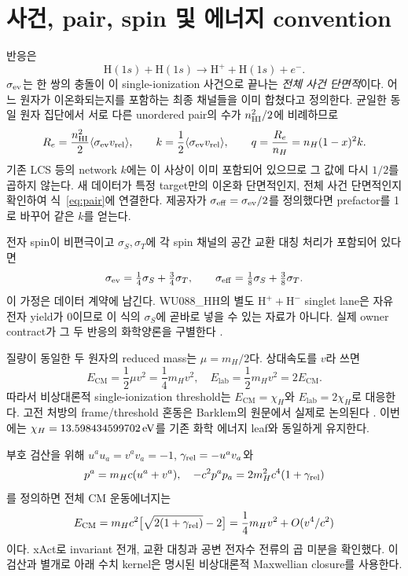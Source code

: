 \documentclass[11pt,a4paper]{article}
\newcommand{\sig}{\sigma_{\rm ev}}\newcommand{\cm}{\mathrm{CM}}\newcommand{\lab}{\mathrm{lab}}\newcommand{\hh}{\mathrm{HH}}
\begin{document}
\newpage
\section{사건, pair, spin 및 에너지 convention}
반응은
\begin{equation}
\mathrm H(1s)+\mathrm H(1s)\longrightarrow\mathrm H^++\mathrm H(1s)+e^-.
\end{equation}
$\sig$는 한 쌍의 충돌이 이 single-ionization 사건으로 끝나는 \emph{전체 사건 단면적}이다. 어느 원자가 이온화되는지를 포함하는 최종 채널들을 이미 합쳤다고 정의한다. 균일한 동일 원자 집단에서 서로 다른 unordered pair의 수가 $n_{\rm HI}^2/2$에 비례하므로
\begin{equation}\label{eq:pair}
R_e=\frac{n_{\rm HI}^2}{2}\langle\sig v_{\rm rel}\rangle,
\qquad k=\frac12\langle\sig v_{\rm rel}\rangle,
\qquad q=\frac{R_e}{n_H}=n_H(1-x)^2k.
\end{equation}
기존 LCS 등의 network $k$에는 이 사상이 이미 포함되어 있으므로 그 값에 다시 $1/2$를 곱하지 않는다. 새 데이터가 특정 target만의 이온화 단면적인지, 전체 사건 단면적인지 확인하여 식~\eqref{eq:pair}에 연결한다. 제공자가 $\sigma_{\rm eff}=\sig/2$를 정의했다면 prefactor를 1로 바꾸어 같은 $k$를 얻는다.

전자 spin이 비편극이고 $\sigma_S,\sigma_T$에 각 spin 채널의 공간 교환 대칭 처리가 포함되어 있다면
\begin{equation}
\sig=\tfrac14\sigma_S+\tfrac34\sigma_T,
\qquad \sigma_{\rm eff}=\tfrac18\sigma_S+\tfrac38\sigma_T.
\end{equation}
이 가정은 데이터 계약에 남긴다. WU088\_HH의 별도 $\mathrm H^++\mathrm H^-$ singlet lane은 자유전자 yield가 0이므로 이 식의 $\sigma_S$에 곧바로 넣을 수 있는 자료가 아니다. 실제 owner contract가 그 두 반응의 화학양론을 구별한다 \cite{hhowner}.

질량이 동일한 두 원자의 reduced mass는 $\mu=m_H/2$다. 상대속도를 $v$라 쓰면
\begin{equation}
E_{\cm}=\frac12\mu v^2=\frac14m_Hv^2,
\quad E_{\lab}=\frac12m_Hv^2=2E_{\cm}.
\end{equation}
따라서 비상대론적 single-ionization threshold는 $E_{\cm}=\chi_H$와 $E_{\lab}=2\chi_H$로 대응한다. 고전 처방의 frame/threshold 혼동은 Barklem의 원문에서 실제로 논의된다 \cite{barklem}. 이번에는 $\chi_H=13.598434599702\,\mathrm{eV}$를 기존 화학 에너지 leaf와 동일하게 유지한다.

부호 검산을 위해 $u^au_a=v^av_a=-1$, $\gamma_{\rm rel}=-u^av_a$와
\begin{equation}
p^a=m_Hc(u^a+v^a),\quad
-c^2p^ap_a=2m_H^2c^4(1+\gamma_{\rm rel})
\end{equation}
를 정의하면 전체 CM 운동에너지는
\begin{equation}
E_{\cm}=m_Hc^2\bigl[\sqrt{2(1+\gamma_{\rm rel})}-2\bigr]
=\frac14m_Hv^2+O(v^4/c^2)
\end{equation}
이다. xAct로 invariant 전개, 교환 대칭과 공변 전자수 전류의 곱 미분을 확인했다. 이 검산과 별개로 아래 수치 kernel은 명시된 비상대론적 Maxwellian closure를 사용한다.
\end{document}
